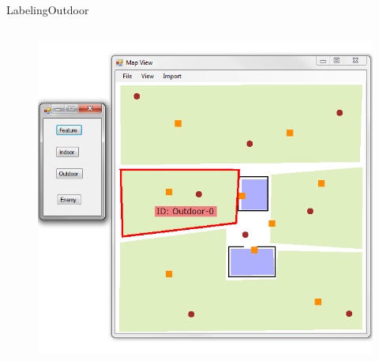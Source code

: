 \begin{frame}{Labeling}{Outdoor}

\begin{columns}
\begin{figure}
\centering
\includegraphics[width = \textwidth]{./screenshot/outdoor_label.png}
\end{figure}

\begin{minipage}{\textwidth}
\end{minipage}
\end{columns}

\end{frame}

